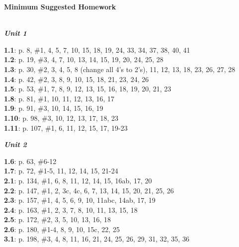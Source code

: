 \documentclass[notes]{subfiles}
\begin{document}
\rhead{}
\lhead{}
\chead{}
\thispagestyle{empty}

	\begin{center}
		\textbf{\Large{Minimum Suggested Homework}}
	\end{center}
		\vspace{.45in}
		
	\hrulefill \\
	\textit{\textbf{Unit 1}}\\
	\begin{flushleft}
		\textbf{1.1}: p. 8, \#1, 4, 5, 7, 10, 15, 18, 19, 24, 33, 34, 37, 38, 40, 41\\
		\textbf{1.2}: p. 19, \#3, 4, 7, 10, 13, 14, 15, 19, 20, 24, 25, 28\\
		\textbf{1.3}: p. 30, \#2, 3, 4, 5, 8 (change all 4's to 2's), 11, 12, 13, 18, 23, 26, 27, 28\\
		\textbf{1.4}: p. 42, \#2, 3, 8, 9, 10, 15, 18, 21, 23, 24, 26\\
		\textbf{1.5}: p. 53, \#1, 7, 8, 9, 12, 13, 15, 16, 18, 19, 20, 21, 23\\
		\textbf{1.8}: p. 81, \#1, 10, 11, 12, 13, 16, 17\\
		\textbf{1.9}: p. 91, \#3, 10, 14, 15, 16, 19\\
		\textbf{1.10}: p. 98, \#3, 10, 12, 13, 17, 18, 23\\
		\textbf{1.11}: p. 107, \#1, 6, 11, 12, 15, 17, 19-23\\
	\end{flushleft}
	\hrulefill
	
	\textit{\textbf{Unit 2}}\\
	\begin{flushleft}
		\textbf{1.6}: p. 63, \#6-12\\
		\textbf{1.7}: p. 72, \#1-5, 11, 12, 14, 15, 21-24\\		
		\textbf{2.1}: p. 134, \#1, 6, 8, 11, 12, 14, 15, 16ab, 17, 20\\
		\textbf{2.2}: p. 147, \#1, 2, 3c, 4c, 6, 7, 13, 14, 15, 20, 21, 25, 26\\
		\textbf{2.3}: p. 157, \#1, 4, 5, 6, 9, 10, 11abc, 14ab, 17, 19\\
		\textbf{2.4}: p. 163, \#1, 2, 3, 7, 8, 10, 11, 13, 15, 18\\
		\textbf{2.5}: p. 172, \#2, 3, 5, 10, 13, 16, 18\\
		\textbf{2.6}: p. 180, \#1-4, 8, 9, 10, 15c, 22, 25\\
		\textbf{3.1}: p. 198, \#3, 4, 8, 11, 16, 21, 24, 25, 26, 29, 31, 32, 35, 36\\
	\end{flushleft}
	
\end{document}
